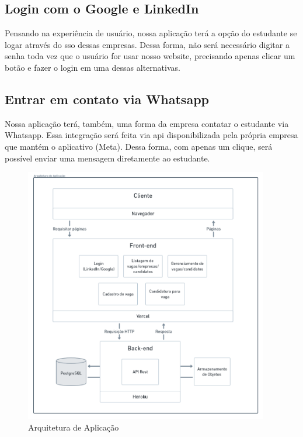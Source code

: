 \subsection{Login com o Google e LinkedIn}
Pensando na experiência de usuário, nossa aplicação terá a opção do estudante se logar através do \ac{sso} dessas empresas. Dessa forma, não será necessário digitar a senha toda vez que o usuário for usar nosso website, precisando apenas clicar um botão e fazer o login em uma dessas alternativas.

\subsection{Entrar em contato via Whatsapp}
Nossa aplicação terá, também, uma forma da empresa contatar o estudante via Whatsapp. Essa integração será feita via \ac{api} disponibilizada pela própria empresa que mantém o aplicativo (Meta). Dessa forma, com apenas um clique, será possível enviar uma mensagem diretamente ao estudante.

\begin{figure}[htb]
	\centering
	\caption{\label{fig_arq_app}Arquitetura de Aplicação}
	\includegraphics[width=0.95\textwidth]{../Figuras/arq-proj-arq-app.png}
\end{figure}

